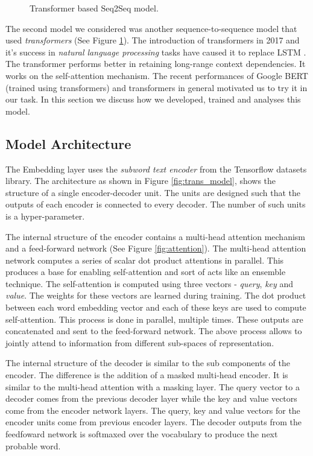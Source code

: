 \begin{figure}[p]
	\begin{center}
	\end{center}
	\caption{Transformer based Seq2Seq model.}
	\label{fig:trans_model_image}
\end{figure}

The second model we considered was another sequence-to-sequence model that used \emph{transformers} (See Figure \ref{fig:trans_model_image}).
The introduction of {transformers} in 2017 and it's success in \emph{natural language processing} tasks have caused it to replace LSTM \cite{DBLP:journals/corr/VaswaniSPUJGKP17}. 
The transformer performs better in retaining long-range context dependencies. 
It works on the self-attention mechanism. 
The recent performances of Google BERT (trained using transformers) and transformers in general motivated us to try it in our task.
In this section we discuss how we developed, trained and analyses this model.

\subsection{Model Architecture}

The Embedding layer uses the \emph{subword text encoder} from the Tensorflow datasets library. 
The architecture as shown in Figure \ref{fig:trans_model}, shows the structure of a single encoder-decoder unit. 
The units are designed such that the outputs of each encoder is connected to every decoder. 
The number of such units is a hyper-parameter.

The internal structure of the encoder contains a multi-head attention mechanism and a feed-forward network (See Figure \ref{fig:attention}). 
The multi-head attention network computes a series of scalar dot product attentions in parallel. 
This produces a base for enabling self-attention and sort of acts like an ensemble technique. 
The self-attention is computed using three vectors - \emph{query}, \emph{key} and \emph{value}. 
The weights for these vectors are learned during training. 
The dot product between each word embedding vector and each of these keys are used to compute self-attention. 
This process is done in parallel, multiple times. 
These outputs are concatenated and sent to the feed-forward network. 
The above process allows to jointly attend to information from different sub-spaces of representation.

The internal structure of the decoder is similar to the sub components of the encoder. 
The difference is the addition of a masked multi-head encoder. 
It is similar to the multi-head attention with a masking layer. 
The query vector to a decoder comes from the previous decoder layer while the key and value vectors come from the encoder network layers. The query, key and value vectors for the encoder units come from previous encoder layers. 
The decoder outputs from the feedfoward network is softmaxed over the vocabulary to produce the next probable word.

